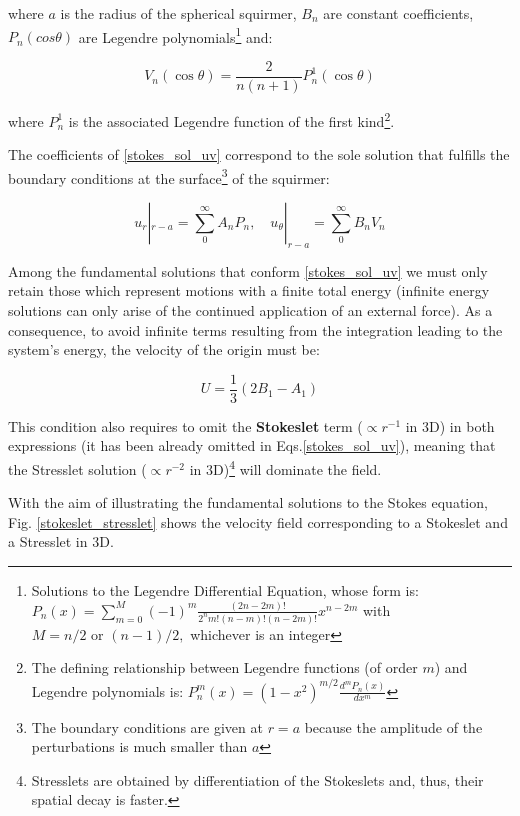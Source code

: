 where $a$ is the radius of the spherical squirmer, $B_n$ are constant coefficients, $P_n(cos \theta)$ are Legendre polynomials\footnote{Solutions to the Legendre Differential Equation, whose form is:\\ $P_{n}(x)=\sum_{m=0}^{M}(-1)^{m} \frac{(2 n-2 m) !}{2^{n} m !(n-m) !(n-2 m) !} x^{n-2 m}$ with \\ $M=n / 2$ or $(n-1) / 2,$ whichever is an integer} and:

\begin{equation}
V_{n}(\cos \theta)=\frac{2}{n(n+1)} P^1_{n}(\cos \theta)
\end{equation}

where $P^1_n$ is the associated Legendre function of the first kind\footnote{The defining relationship between Legendre functions (of order $m$) and Legendre polynomials is: $P_{n}^{m}(x)=\left(1-x^{2}\right)^{m / 2} \frac{d^{m} P_{n}(x)}{d x^{m}}$}.

The coefficients of \ref{stokes_sol_uv} correspond to the sole solution that fulfills the boundary conditions at the surface\footnote{The boundary conditions are given at $r=a$ because the amplitude of the perturbations is much smaller than $a$} of the squirmer:

\begin{equation}
u_r|_{r-a}=\sum_{0}^{\infty} A_{n} P_{n}, \quad u_\theta|_{r-a}=\sum_{0}^{\infty} B_{n} V_{n}
\end{equation}

Among the fundamental solutions that conform \ref{stokes_sol_uv} we must only retain those which represent motions with a finite total energy (infinite energy solutions can only arise of the continued application of an external force). As a consequence, to avoid infinite terms resulting from the integration leading to the system's energy, the velocity of the origin must be:

\begin{equation}
	U=\frac{1}{3}\left(2 B_{1}-A_{1}\right)
	\label{deformation_vel}
\end{equation}

This condition also requires to omit the \textbf{Stokeslet} term ($\propto r^{-1}$ in 3D) in both expressions (it has been already omitted in Eqs.\ref{stokes_sol_uv}), meaning that the Stresslet solution ($\propto r^{-2}$ in 3D)\footnote{Stresslets are obtained by differentiation of the Stokeslets and, thus, their spatial decay is faster.} will dominate the field.

With the aim of illustrating the fundamental solutions to the Stokes equation, Fig. \ref{stokeslet_stresslet} shows the velocity field corresponding to a Stokeslet and a Stresslet in 3D.

